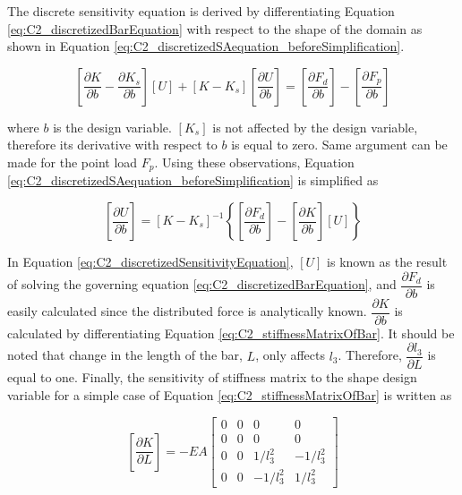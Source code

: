 The discrete sensitivity equation is derived by differentiating Equation \eqref{eq:C2_discretizedBarEquation} with respect to the shape of the domain as shown in Equation \eqref{eq:C2_discretizedSAequation_beforeSimplification}.

\begin{equation}\label{eq:C2_discretizedSAequation_beforeSimplification}
	\left[ \frac{\partial K}{\partial b} - \frac{\partial K_s}{\partial b} \right] [U] + 
	[K - K_s] \left[ \frac{\partial U}{\partial b} \right] = 
	\left[ \frac{\partial F_d}{\partial b} \right] - 
	\left[ \frac{\partial F_p}{\partial b} \right]
\end{equation}

where $b$ is the design variable. $[K_s]$ is not affected by the design variable, therefore its derivative with respect to $b$ is equal to zero. Same argument can be made for the point load $F_p$. Using these observations, Equation \eqref{eq:C2_discretizedSAequation_beforeSimplification} is simplified as

\begin{equation}\label{eq:C2_discretizedSensitivityEquation}
	\left[ \frac{\partial U}{\partial b} \right] = 
	[K - K_s]^{-1}
	\left\{
	\left[ \frac{\partial F_d}{\partial b} \right] - \left[ \frac{\partial K}{\partial b} \right] [U]
	\right\}
\end{equation}

In Equation \eqref{eq:C2_discretizedSensitivityEquation}, $[U]$ is known as the result of solving the governing equation \eqref{eq:C2_discretizedBarEquation}, and $\dfrac{\partial F_d}{\partial b}$ is easily calculated since the distributed force is analytically known. $\dfrac{\partial K}{\partial b}$ is calculated by differentiating Equation \eqref{eq:C2_stiffnessMatrixOfBar}. It should be noted that change in the length of the bar, $L$, only affects $l_3$. Therefore, $\dfrac{\partial l_3}{\partial L}$ is equal to one. Finally, the sensitivity of stiffness matrix to the shape design variable for a simple case of Equation \eqref{eq:C2_stiffnessMatrixOfBar} is written as

\begin{equation}\label{eq:C2_sensitivityOfStiffnessMatrixOfBar}
	\left[ \frac{\partial K}{\partial L} \right] = 
	-EA
	\begin{bmatrix}
	0 & 0 & 0 & 0 \\
	0 & 0 & 0 & 0 \\
	0 & 0 & 1/l_3^2 & -1/l_3^2 \\
	0 & 0 & -1/l_3^2 & 1/l_3^2
	\end{bmatrix}
\end{equation}

